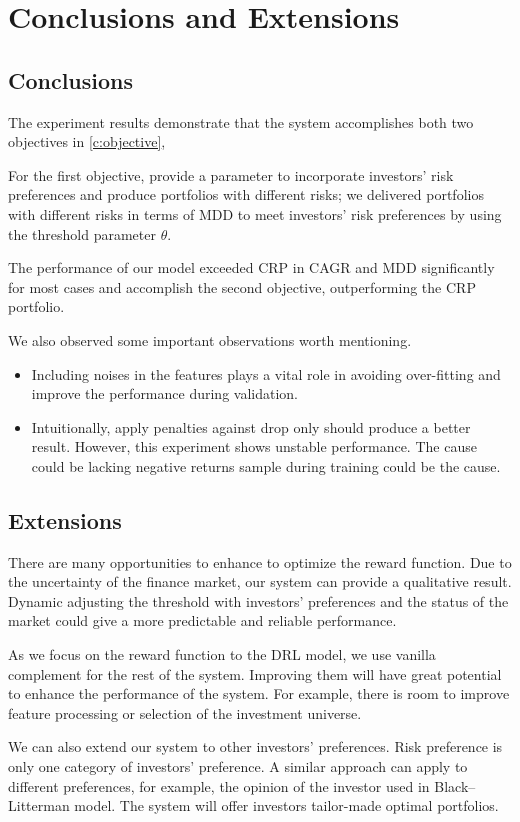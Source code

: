 \chapter{Conclusions and Extensions}
\label{c:conclusion}
\section{Conclusions}
The experiment results demonstrate that the system accomplishes both two objectives in \autoref{c:objective},
\par
For the first objective, provide a parameter to incorporate investors' risk preferences and produce portfolios with different risks; we delivered portfolios with different risks in terms of MDD to meet investors' risk preferences by using the threshold parameter $\theta$.
\par
The performance of our model exceeded CRP in CAGR and MDD significantly for most cases and accomplish the second objective, outperforming the CRP portfolio.
\par
We also observed some important observations worth mentioning.
\begin{itemize}
    \item Including noises in the features plays a vital role in avoiding over-fitting and improve the performance during validation. 
    \item Intuitionally, apply penalties against drop only should produce a better result. However, this experiment shows unstable performance. The cause could be lacking negative returns sample during training could be the cause.
\end{itemize}

\section{Extensions}
There are many opportunities to enhance to optimize the reward function. Due to the uncertainty of the finance market, our system can provide a qualitative result. Dynamic adjusting the threshold with investors' preferences and the status of the market could give a more predictable and reliable performance.

As we focus on the reward function to the DRL model, we use vanilla complement for the rest of the system. Improving them will have great potential to enhance the performance of the system. For example, there is room to improve feature processing or selection of the investment universe.

\par
We can also extend our system to other investors' preferences. Risk preference is only one category of investors' preference. A similar approach can apply to different preferences, for example, the opinion of the investor used in Black–Litterman model\cite{black1992global}. The system will offer investors tailor-made optimal portfolios.